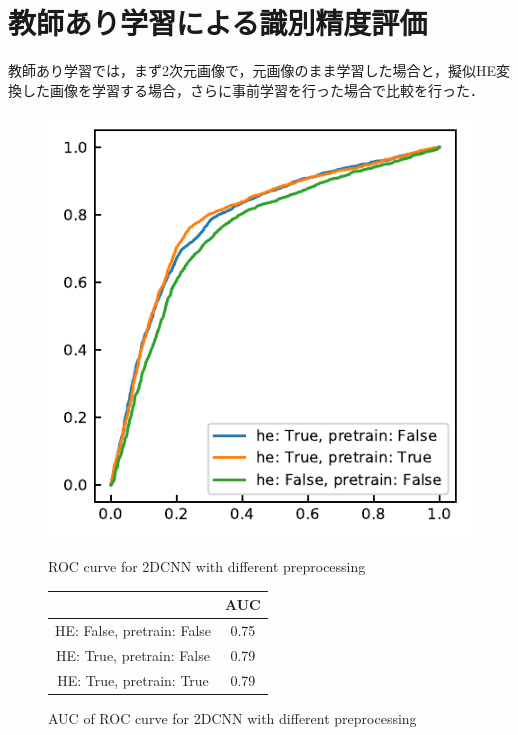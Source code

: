 \section{教師あり学習による識別精度評価}
教師あり学習では，まず2次元画像で，元画像のまま学習した場合と，擬似HE変換した画像を学習する場合，さらに事前学習を行った場合で比較を行った．

\begin{figure}[H]
	\centering
	\begin{minipage}{0.5\columnwidth}
		\centering
		\includegraphics[width=\linewidth]{fig/chapter4/2dcnn_preprocessing}
		\caption{ROC curve for 2DCNN with different preprocessing}
		\label{fig:2dcnnpreprocessing}
	\end{minipage}
	\makeatletter
	\def\@captype{table}
	\makeatother
	\begin{minipage}{0.4\columnwidth}
		\centering
		\caption{AUC of ROC curve for 2DCNN with different preprocessing}
		\label{tab:2DCNNpreprocessing_AUC}
		\begin{tabular}{cc}\toprule
			& AUC \\ \midrule
			HE: False, pretrain: False & 0.75 \\ 
			HE: True, pretrain: False & 0.79 \\ 
			HE: True, pretrain: True & 0.79 \\ \bottomrule
		\end{tabular} 
	\end{minipage}
\end{figure}

